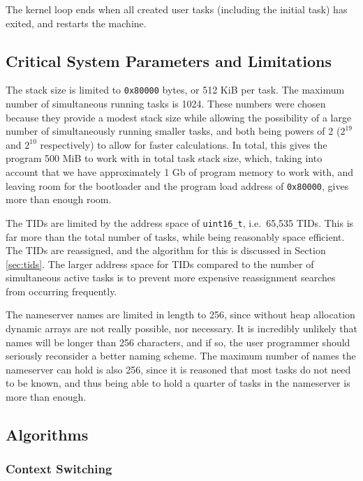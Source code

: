 \documentclass[12pt, titlepage]{article}
\begin{document}
    The kernel loop ends when all created user tasks (including the initial task) has exited, and restarts the machine.

    \subsection{Critical System Parameters and Limitations}
    \label{sec:limits}
    The stack size is limited to \verb`0x80000` bytes, or 512 KiB per task. The maximum number of simultaneous running tasks is 1024. These numbers were chosen because they provide a modest stack size while allowing the possibility of a large number of simultaneously running smaller tasks, and both being powers of 2 ($2^{19}$ and $2^{10}$ respectively) to allow for faster calculations. In total, this gives the program 500 MiB to work with in total task stack size, which, taking into account that we have approximately 1 Gb of program memory to work with, and leaving room for the bootloader and the program load address of \verb`0x80000`, gives more than enough room.

    The TIDs are limited by the address space of \verb`uint16_t`, i.e.\ 65,535 TIDs. This is far more than the total number of tasks, while being reasonably space efficient. The TIDs are reassigned, and the algorithm for this is discussed in Section \ref{sec:tids}. The larger address space for TIDs compared to the number of simultaneous active tasks is to prevent more expensive reassignment searches from occurring frequently.

    The nameserver names are limited in length to 256, since without heap allocation dynamic arrays are not really possible, nor necessary. It is incredibly unlikely that names will be longer than 256 characters, and if so, the user programmer should seriously reconsider a better naming scheme. The maximum number of names the nameserver can hold is also 256, since it is reasoned that most tasks do not need to be known, and thus being able to hold a quarter of tasks in the nameserver is more than enough.

    \subsection{Algorithms}

    \subsubsection{Context Switching}
    \label{sec:context-switch}
\end{document}
